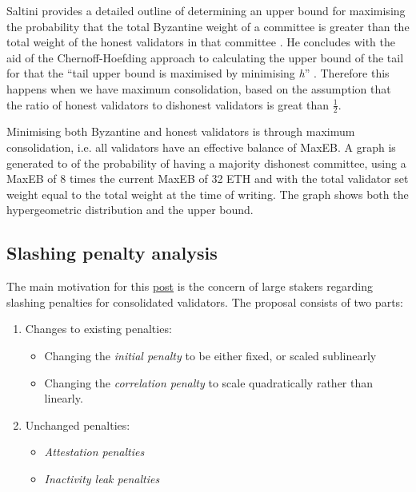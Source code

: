 \documentclass[UTF8]{article}
\begin{document}
Saltini provides a detailed outline of determining an upper bound for maximising the probability that the total Byzantine weight of a committee is greater than the total weight of the honest validators in that committee \cite{Saltini2023}. He concludes with the aid of the Chernoff-Hoefding approach to calculating the upper bound of the tail for  that the ``tail upper bound is maximised by minimising \textit{h}'' \cite{Saltini2023}. Therefore this happens when we have maximum consolidation, based on the assumption that the ratio of honest validators to dishonest validators is great than $\frac{1}{2}$.

Minimising both Byzantine and honest validators is through maximum consolidation, i.e. all validators have an effective balance of MaxEB. A graph is generated to of the probability of having a majority dishonest committee, using a MaxEB of 8 times the current MaxEB of 32 ETH and with the total validator set weight equal to the total weight at the time of writing. The graph shows both the hypergeometric distribution and the upper bound.

\subsection{Slashing penalty analysis}
The main motivation for this \href{https://notes.ethereum.org/@mikeneuder/slashings-eip-7251}{post} is the concern of large stakers regarding slashing penalties for consolidated validators. The proposal consists of two parts:
\begin{enumerate}
\item Changes to existing penalties:
	\begin{itemize}
	\item Changing the \textit{initial penalty} to be either fixed, or scaled sublinearly
	\item Changing the \textit{correlation penalty} to scale quadratically rather than linearly.
	\end{itemize}
\item Unchanged penalties:
	\begin{itemize}
	\item \textit{Attestation penalties}
	\item \textit{Inactivity leak penalties}
	\end{itemize}
\end{enumerate}
\end{document}
